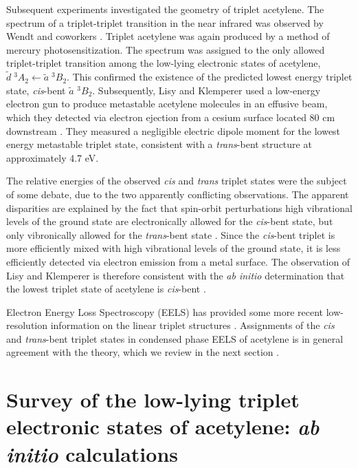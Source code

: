 Subsequent experiments investigated the geometry of triplet acetylene.
The spectrum of a triplet-triplet transition in the near
infrared was observed by Wendt and coworkers \cite{wendt79}.  Triplet
acetylene was again produced by a method of mercury
photosensitization.  The spectrum was assigned to the only allowed
triplet-triplet transition among the low-lying electronic states of
acetylene, $\tilde{d} \; ^3A_2 \leftarrow \tilde{a} \; ^3B_2$.  This
confirmed the existence of the predicted lowest energy triplet state,
\emph{cis}-bent $\tilde{a}$ $^3B_2$.  Subsequently, Lisy and Klemperer
used a low-energy electron gun to produce metastable acetylene
molecules in an effusive beam, which they detected via electron
ejection from a cesium surface located 80 cm downstream \cite{lisy80,
  hemminger76}.  They measured a negligible electric dipole moment for
the lowest energy metastable triplet state, consistent with a
\emph{trans}-bent structure at approximately 4.7 eV.

The relative energies of the observed \emph{cis} and \emph{trans}
triplet states were the subject of some debate, due to the two
apparently conflicting observations.  The apparent disparities are
explained by the fact that spin-orbit perturbations high vibrational
levels of the ground state are electronically allowed for the
\emph{cis}-bent state, but only vibronically allowed for the
\emph{trans}-bent state \cite{lundberg93}.  Since the \emph{cis}-bent
triplet is more efficiently mixed with high vibrational levels of the
ground state, it is less efficiently detected via electron emission
from a metal surface.  The observation of Lisy and Klemperer is
therefore consistent with the \emph{ab initio} determination that the
lowest triplet state of acetylene is \emph{cis}-bent
\cite{lundberg93}.

Electron Energy Loss Spectroscopy (EELS) has provided some more recent
low-resolution information on the linear triplet structures
\cite{dressler87, swiderek97}.  Assignments of the \emph{cis} and
\emph{trans}-bent triplet states in condensed phase EELS of acetylene
is in general agreement with the theory, which we review in the next
section \cite{malsch98}.


\section{Survey of the low-lying triplet electronic states of
  acetylene: \emph{ab initio} calculations}


